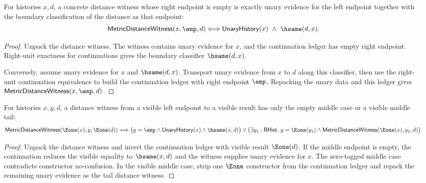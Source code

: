 \begin{theorem}
\label{thm:metric-distance-witness-empty-right-iff}
For histories $x,d$, a concrete distance witness whose right endpoint is empty
is exactly unary evidence for the left endpoint together with the boundary
classification of the distance as that endpoint:
$$
\mathsf{MetricDistanceWitness}(x,\emp,d)
\Longleftrightarrow
\mathsf{UnaryHistory}(x)\ \wedge\ \hsame(d,x).
$$
\end{theorem}
\begin{proof}
Unpack the distance witness. The witness contains unary evidence for $x$, and
the continuation ledger has empty right endpoint. Right-unit exactness for
continuations gives the boundary classifier $\hsame(d,x)$.

Conversely, assume unary evidence for $x$ and $\hsame(d,x)$. Transport unary
evidence from $x$ to $d$ along this classifier, then use the right-unit
continuation equivalence to build the continuation ledger with right endpoint
$\emp$. Repacking the unary data and this ledger gives
$\mathsf{MetricDistanceWitness}(x,\emp,d)$.
\end{proof}

\begin{theorem}
\label{thm:metric-distance-witness-left-e1-result-cases}
For histories $x,y,d$, a distance witness from a visible left endpoint to a
visible result has only the empty middle case or a visible middle tail:
$$
\mathsf{MetricDistanceWitness}(\Eone(x),y,\Eone(d))
\Longrightarrow
\bigl(y=\emp\land\mathsf{UnaryHistory}(x)\land\hsame(x,d)\bigr)
\lor
\bigl(\exists y_1:\mathsf{BHist}.\;
y=\Eone(y_1)\land
\mathsf{MetricDistanceWitness}(\Eone(x),y_1,d)\bigr).
$$
\end{theorem}
\begin{proof}
Unpack the distance witness and invert the continuation ledger with visible
result $\Eone(d)$. If the middle endpoint is empty, the continuation reduces
the visible equality to $\hsame(x,d)$ and the witness supplies unary evidence
for $x$. The zero-tagged middle case contradicts constructor no-confusion. In
the visible middle case, strip one $\Eone$ constructor from the continuation
ledger and repack the remaining unary evidence as the tail distance witness.
\end{proof}

